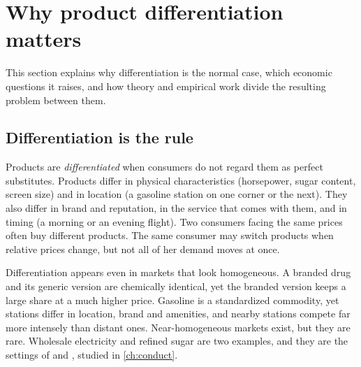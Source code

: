 \section{Why product differentiation matters}\label{sec:04-why}

This section explains why differentiation is the normal case, which economic questions it raises, and how theory
and empirical work divide the resulting problem between them.

\subsection{Differentiation is the rule}\label{sec:04-why-rule}

Products are \emph{differentiated} when consumers do not regard them as perfect substitutes. Products differ in
physical characteristics (horsepower, sugar content, screen size) and in location (a gasoline station on one
corner or the next). They also differ in brand and reputation, in the service that comes with them, and in timing
(a morning or an evening flight). Two consumers facing the same prices often buy different products. The same consumer may switch
products when relative prices change, but not all of her demand moves at once.

Differentiation appears even in markets that look homogeneous. A branded drug and its generic version are
chemically identical, yet the branded version keeps a large share at a much higher price. Gasoline is a
standardized commodity, yet stations differ in location, brand and amenities, and nearby stations compete far
more intensely than distant ones. Near-homogeneous markets exist, but they are rare. Wholesale electricity and
refined sugar are two examples, and they are the settings of \citet{Wolfram1999} and
\citet{GenesoveMullin1998}, studied in \cref{ch:conduct}.

